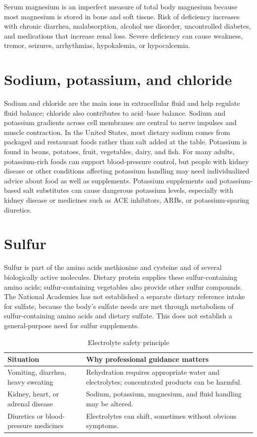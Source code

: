 Serum magnesium is an imperfect measure of total body magnesium because most magnesium is stored in bone and soft tissue. Risk of deficiency increases with chronic diarrhea, malabsorption, alcohol use disorder, uncontrolled diabetes, and medications that increase renal loss. Severe deficiency can cause weakness, tremor, seizures, arrhythmias, hypokalemia, or hypocalcemia. \cite{odsMg}

\section{Sodium, potassium, and chloride}
Sodium and chloride are the main ions in extracellular fluid and help regulate fluid balance; chloride also contributes to acid--base balance. Sodium and potassium gradients across cell membranes are central to nerve impulses and muscle contraction. In the United States, most dietary sodium comes from packaged and restaurant foods rather than salt added at the table. Potassium is found in beans, potatoes, fruit, vegetables, dairy, and fish. For many adults, potassium-rich foods can support blood-pressure control, but people with kidney disease or other conditions affecting potassium handling may need individualized advice about food as well as supplements. Potassium supplements and potassium-based salt substitutes can cause dangerous potassium levels, especially with kidney disease or medicines such as ACE inhibitors, ARBs, or potassium-sparing diuretics. \cite{napElectrolytes,ahaPotassium,ahaSodium}

\section{Sulfur}
Sulfur is part of the amino acids methionine and cysteine and of several biologically active molecules. Dietary protein supplies these sulfur-containing amino acids; sulfur-containing vegetables also provide other sulfur compounds. The National Academies has not established a separate dietary reference intake for sulfate, because the body's sulfate needs are met through metabolism of sulfur-containing amino acids and dietary sulfate. This does not establish a general-purpose need for sulfur supplements. \cite{napElectrolytes}

\begin{table}[ht]
\centering
\caption{Electrolyte safety principle}
\begin{tabular}{p{}p{}}
\toprule
Situation & Why professional guidance matters \\
\midrule
Vomiting, diarrhea, heavy sweating & Rehydration requires appropriate water and electrolytes; concentrated products can be harmful.\\
Kidney, heart, or adrenal disease & Sodium, potassium, magnesium, and fluid handling may be altered.\\
Diuretics or blood-pressure medicines & Electrolytes can shift, sometimes without obvious symptoms.\\
\bottomrule
\end{tabular}
\end{table}

